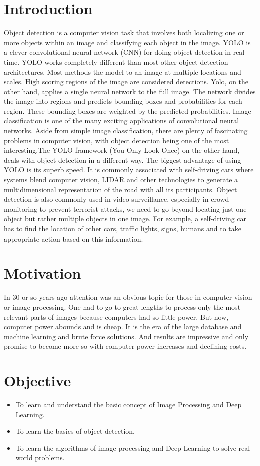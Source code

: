 \documentclass[11pt, oneside]{Thesis} %
\begin{document}
\begin{titlepage}
			\section*{Introduction}
			Object detection is a computer vision task that involves both localizing one or more objects within an image and classifying each object in the image. YOLO is a clever convolutional neural network (CNN) for doing object detection in real-time. YOLO works completely different than most other object detection architectures. Most methods the model to an image at multiple locations and scales. High scoring regions of the image are considered detections. Yolo, on the other hand, applies a single neural network to the full image. The network divides the image into regions and predicts bounding boxes and probabilities for each region. These bounding boxes are weighted by the predicted probabilities. Image classification is one of the many exciting applications of convolutional neural networks. Aside from simple image classification, there are plenty of fascinating problems in computer vision, with object detection being one of the most interesting.The YOLO framework (You Only Look Once) on the other hand, deals with object detection in a different way. The biggest advantage of using YOLO is its superb speed. It is commonly associated with self-driving cars where systems blend computer vision, LIDAR and other technologies to generate a multidimensional representation of the road with all its participants. Object detection is also commonly used in video surveillance, especially in crowd monitoring to prevent terrorist attacks, we need to go beyond locating just one object but rather multiple objects in one image. For example, a self-driving car has to find the location of other cars, traffic lights, signs, humans and to take appropriate action based on this information.
			\section*{Motivation}
			In 30 or so years ago attention was an obvious topic for those in computer vision or image processing. One had to go to great lengths to process only the most relevant parts of images because computers had so little power. But now, computer power abounds and is cheap. It is the era of the large database and machine learning and brute force solutions. And results are impressive and only promise to become more so with computer power increases and declining costs.
			\section*{Objective}
			\begin{itemize}
				\itemsep0em 
 				 \item To learn and understand the basic concept of Image Processing and Deep Learning.
 				 \item To learn the basics of object detection.
 				 \item To learn the algorithms of image processing and Deep Learning to solve real world problems.
			\end{itemize}
					

\end{titlepage}
\end{document}
